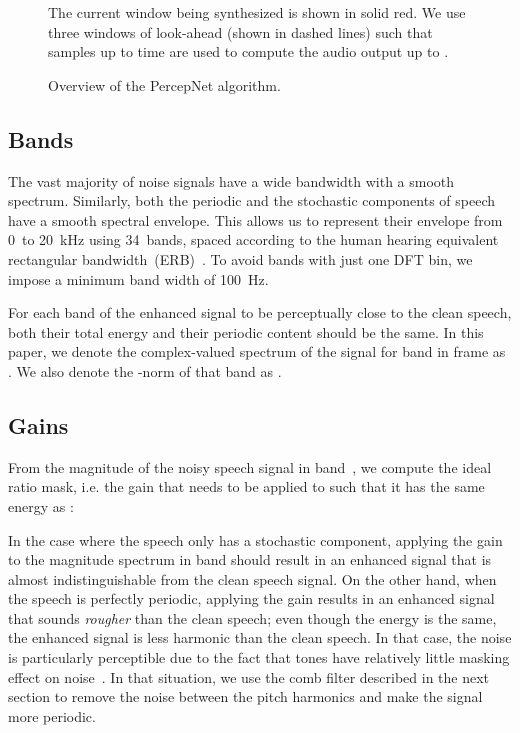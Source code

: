 \documentclass[english]{article}
\begin{document}
\begin{figure}
\caption{The current window being synthesized is shown in solid red. We use
three windows of look-ahead (shown in dashed lines) such that samples
up to time  are used to compute the audio output up to
.\label{fig:windowing} }


\end{figure}


\begin{figure}
\caption{Overview of the PercepNet algorithm.\label{fig:Overview-of-algorithm}}
\end{figure}



\subsection{Bands}

The vast majority of noise signals have a wide bandwidth with a smooth
spectrum. Similarly, both the periodic and the stochastic components
of speech have a smooth spectral envelope. This allows us to represent
their envelope from 0~to 20~kHz using 34~bands, spaced according
to the human hearing equivalent rectangular bandwidth~(ERB)~\cite{moore2012introduction}.
To avoid bands with just one DFT bin, we impose a minimum band width
of 100~Hz.

For each band of the enhanced signal to be perceptually close to the
clean speech, both their total energy and their periodic content should
be the same. In this paper, we denote the complex-valued spectrum
of the signal  for band  in frame  as
. We also denote the -norm
of that band as .


\subsection{Gains}

From the magnitude of the noisy speech signal in band~, we compute
the ideal ratio mask, i.e. the gain that needs to be applied to 
such that it has the same energy as :

In the case where the speech only has a stochastic component, applying
the gain  to the magnitude spectrum in band
 should result in an enhanced signal that is almost indistinguishable
from the clean speech signal. On the other hand, when the speech is
perfectly periodic, applying the gain  results
in an enhanced signal that sounds \emph{rougher} than the clean speech;
even though the energy is the same, the enhanced signal is less harmonic
than the clean speech. In that case, the noise is particularly perceptible
due to the fact that tones have relatively little masking effect on
noise~\cite{gockel2003asymmetry}. In that situation, we use the
comb filter described in the next section to remove the noise between
the pitch harmonics and make the signal more periodic.
\end{document}
